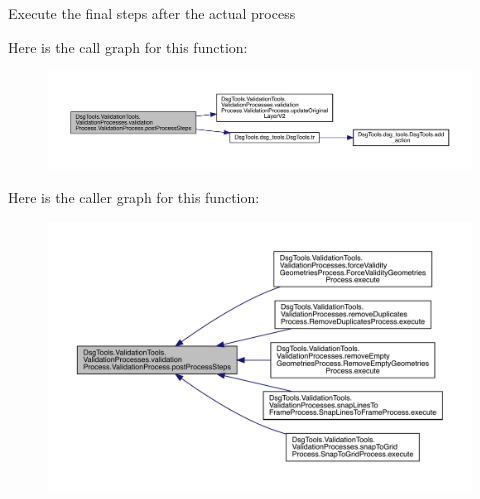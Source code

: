 \begin{DoxyVerb}Execute the final steps after the actual process
\end{DoxyVerb}
 Here is the call graph for this function\+:
\nopagebreak
\begin{figure}[H]
\begin{center}
\leavevmode
\includegraphics[width=350pt]{class_dsg_tools_1_1_validation_tools_1_1_validation_processes_1_1validation_process_1_1_validation_process_ad6b6386ccfcef5397314e14c0341d896_cgraph}
\end{center}
\end{figure}
Here is the caller graph for this function\+:
\nopagebreak
\begin{figure}[H]
\begin{center}
\leavevmode
\includegraphics[width=350pt]{class_dsg_tools_1_1_validation_tools_1_1_validation_processes_1_1validation_process_1_1_validation_process_ad6b6386ccfcef5397314e14c0341d896_icgraph}
\end{center}
\end{figure}
\mbox{\label{class_dsg_tools_1_1_validation_tools_1_1_validation_processes_1_1validation_process_1_1_validation_process_a96fcc66b1ea9c259a30779fa832202c2}} 
